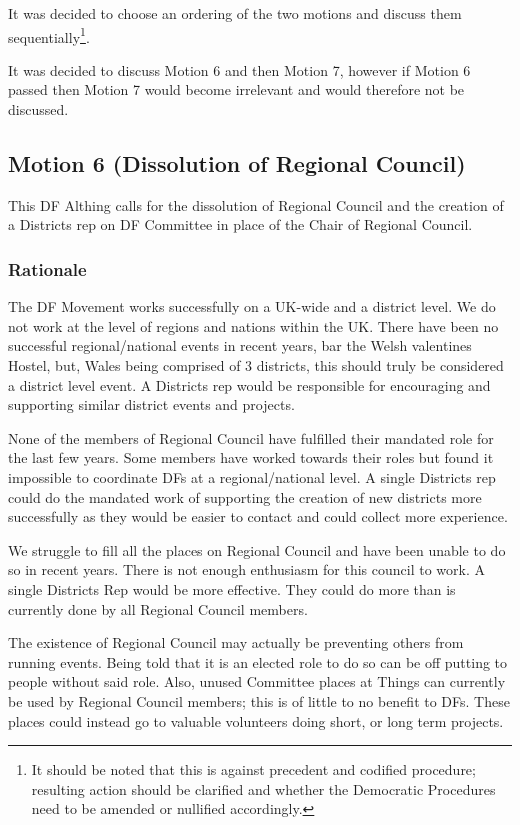 \documentclass[a4paper, 11pt]{article} %
\begin{document}
It was decided to choose an ordering of the two motions and discuss them sequentially\footnote{It should be noted that this is against precedent and codified procedure; resulting action should be clarified and whether the Democratic Procedures need to be amended or nullified accordingly.}.

It was decided to discuss Motion 6 and then Motion 7, however if Motion 6 passed then Motion 7 would become irrelevant and would therefore not be discussed.

\subsection{Motion 6 (Dissolution of Regional Council)}
\label{motion:rcdissolve}

This DF Althing calls for the dissolution of Regional Council and the creation of a Districts rep on DF Committee in place of the Chair of Regional Council.

\subsubsection{Rationale}

The DF Movement works successfully on a UK-wide and a district level.  We do not work at the level of regions and nations within the UK.  There have been no successful regional/national events in recent years, bar the Welsh valentines Hostel, but, Wales being comprised of 3 districts, this should truly be considered a district level event.  A Districts rep would be responsible for encouraging and supporting similar district events and projects.

None of the members of Regional Council have fulfilled their mandated role for the last few years.  Some members have worked towards their roles but found it impossible to coordinate DFs at a regional/national level.  A single Districts rep could do the mandated work of supporting the creation of new districts more successfully as they would be easier to contact and could collect more experience.

We struggle to fill all the places on Regional Council and have been unable to do so in recent years.  There is not enough enthusiasm for this council to work.  A single Districts Rep would be more effective.  They could do more than is currently done by all Regional Council members.

The existence of Regional Council may actually be preventing others from running events.  Being told that it is an elected role to do so can be off putting to people without said role.  Also, unused Committee places at Things can currently be used by Regional Council members; this is of little to no benefit to DFs.  These places could instead go to valuable volunteers doing short, or long term projects.
\end{document}

